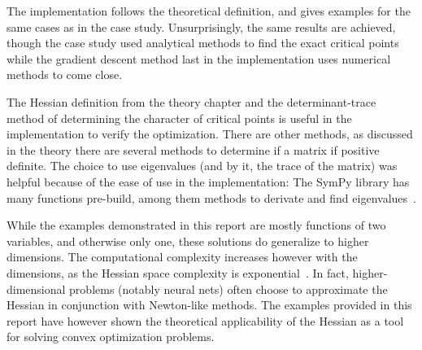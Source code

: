 \documentclass[../convex_optimization.tex]{subfiles}
\begin{document}
The implementation follows the theoretical definition, and gives examples
for the same cases as in the case study.
Unsurprisingly, the same results are achieved, though the case study
used analytical methods to find the exact critical points while
the gradient descent method last in the implementation uses
numerical methods to come close.

The Hessian definition from the theory chapter and the determinant-trace
method of determining the character of critical points is useful in the
implementation to verify the optimization. There are other methods,
as discussed in the theory there are several methods to determine if a
matrix if positive definite. The choice to use eigenvalues (and by it,
the trace of the matrix) was helpful because of the ease of use in the
implementation: The SymPy library has many functions pre-build, among
them methods to derivate and find eigenvalues~\cite{sympy}.

While the examples demonstrated in this report are mostly functions of
two variables, and otherwise only one, these solutions do generalize 
to higher dimensions. The computational complexity increases however with
the dimensions, as the Hessian space complexity is exponential~\cite{hessian_wiki}.
In fact, higher-dimensional problems (notably neural nets) often choose
to approximate the Hessian in conjunction with Newton-like methods.
The examples provided in this report have however shown the theoretical
applicability of the Hessian as a tool for solving convex optimization problems.
\end{document}

